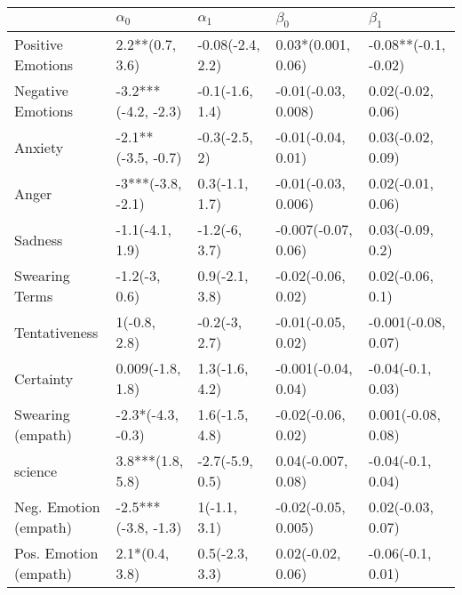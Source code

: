 \begin{tabular}{lllll}
\toprule
{} &           $\alpha_0$ &        $\alpha_1$ &            $\beta_0$ &             $\beta_1$ \\
\midrule
Positive Emotions     &      2.2**(0.7, 3.6) &  -0.08(-2.4, 2.2) &   0.03*(0.001, 0.06) &  -0.08**(-0.1, -0.02) \\
Negative Emotions     &  -3.2***(-4.2, -2.3) &   -0.1(-1.6, 1.4) &  -0.01(-0.03, 0.008) &     0.02(-0.02, 0.06) \\
Anxiety               &   -2.1**(-3.5, -0.7) &     -0.3(-2.5, 2) &   -0.01(-0.04, 0.01) &     0.03(-0.02, 0.09) \\
Anger                 &    -3***(-3.8, -2.1) &    0.3(-1.1, 1.7) &  -0.01(-0.03, 0.006) &     0.02(-0.01, 0.06) \\
Sadness               &      -1.1(-4.1, 1.9) &     -1.2(-6, 3.7) &  -0.007(-0.07, 0.06) &      0.03(-0.09, 0.2) \\
Swearing Terms        &        -1.2(-3, 0.6) &    0.9(-2.1, 3.8) &   -0.02(-0.06, 0.02) &      0.02(-0.06, 0.1) \\
Tentativeness         &         1(-0.8, 2.8) &     -0.2(-3, 2.7) &   -0.01(-0.05, 0.02) &   -0.001(-0.08, 0.07) \\
Certainty             &     0.009(-1.8, 1.8) &    1.3(-1.6, 4.2) &  -0.001(-0.04, 0.04) &     -0.04(-0.1, 0.03) \\
Swearing (empath)     &    -2.3*(-4.3, -0.3) &    1.6(-1.5, 4.8) &   -0.02(-0.06, 0.02) &    0.001(-0.08, 0.08) \\
science               &     3.8***(1.8, 5.8) &   -2.7(-5.9, 0.5) &   0.04(-0.007, 0.08) &     -0.04(-0.1, 0.04) \\
Neg. Emotion (empath) &  -2.5***(-3.8, -1.3) &      1(-1.1, 3.1) &  -0.02(-0.05, 0.005) &     0.02(-0.03, 0.07) \\
Pos. Emotion (empath) &       2.1*(0.4, 3.8) &    0.5(-2.3, 3.3) &    0.02(-0.02, 0.06) &     -0.06(-0.1, 0.01) \\
\bottomrule
\end{tabular}
